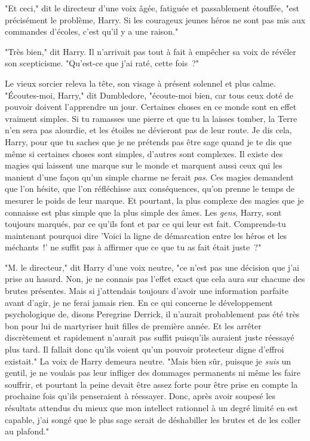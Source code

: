 "Et ceci," dit le directeur d'une voix âgée, fatiguée et passablement étouffée, "est précisément le problème, Harry. Si les courageux jeunes héros ne sont pas mis aux commandes d'écoles, c'est qu'il y a une raison."

"Très bien," dit Harry. Il n'arrivait pas tout à fait à empêcher sa voix de révéler son scepticisme. "Qu'est-ce que j'ai raté, cette fois~?"

Le vieux sorcier releva la tête, son visage à présent solennel et plus calme. "Écoutes-moi, Harry," dit Dumbledore, "écoute-moi bien, car tous ceux doté de pouvoir doivent l'apprendre un jour. Certaines choses en ce monde sont en effet vraiment simples. Si tu ramasses une pierre et que tu la laisses tomber, la Terre n'en sera pas alourdie, et les étoiles ne dévieront pas de leur route. Je dis cela, Harry, pour que tu saches que je ne prétends pas être sage quand je te dis que même si certaines choses sont simples, d'autres sont complexes. Il existe des magies qui laissent une marque sur le monde et marquent aussi ceux qui les manient d'une façon qu'un simple charme ne ferait \emph{pas}. Ces magies demandent que l'on hésite, que l'on réfléchisse aux conséquences, qu'on prenne le temps de mesurer le poids de leur marque. Et pourtant, la plus complexe des magies que je connaisse est plus simple que la plus simple des âmes. Les \emph{gens}, Harry, sont toujours marqués, par ce qu'ils font et par ce qui leur est fait. Comprends-tu maintenant pourquoi dire 'Voici la ligne de démarcation entre les héros et les méchants~!' ne suffit pas à affirmer que ce que tu as fait était juste~?"

"M. le directeur," dit Harry d'une voix neutre, "ce n'est pas une décision que j'ai prise au hasard. Non, je ne connais pas l'effet exact que cela aura sur chacune des brutes présentes. Mais si j'attendais toujours d'avoir une information parfaite avant d'agir, je ne ferai jamais rien. En ce qui concerne le développement psychologique de, disons Peregrine Derrick, il n'aurait probablement pas été très bon pour lui de martyriser huit filles de première année. Et les arrêter discrètement et rapidement n'aurait pas suffit puisqu'ils auraient juste réessayé plus tard. Il fallait donc qu'ils voient qu'un pouvoir protecteur digne d'effroi existait." La voix de Harry demeura neutre. "Mais bien sûr, puisque je \emph{suis} un gentil, je ne voulais pas leur infliger des dommages permanents ni même les faire souffrir, et pourtant la peine devait être assez forte pour être prise en compte la prochaine fois qu'ils penseraient à réessayer. Donc, après avoir soupesé les résultats attendus du mieux que mon intellect rationnel à un degré limité en est capable, j'ai songé que le plus sage serait de déshabiller les brutes et de les coller au plafond."

